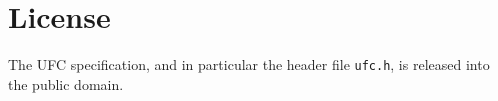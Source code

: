 \chapter{License}

The UFC specification, and in particular the header file
\texttt{ufc.h}, is released into the public domain.
